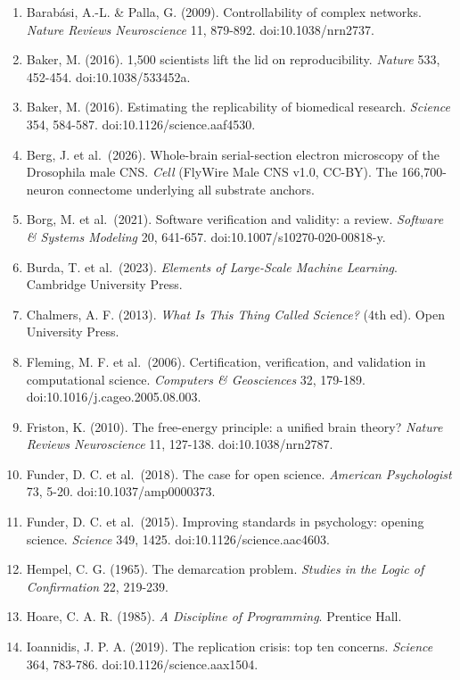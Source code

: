 \documentclass[
]{article}
\providecommand{\tightlist}{%
  \setlength{\itemsep}{0pt}\setlength{\parskip}{0pt}}
\begin{document}
\begin{enumerate}
\def\labelenumi{\arabic{enumi}.}
\tightlist
\item
  Barabási, A.-L. \& Palla, G. (2009). Controllability of complex
  networks. \emph{Nature Reviews Neuroscience} 11, 879-892.
  doi:10.1038/nrn2737.
\item
  Baker, M. (2016). 1,500 scientists lift the lid on reproducibility.
  \emph{Nature} 533, 452-454. doi:10.1038/533452a.
\item
  Baker, M. (2016). Estimating the replicability of biomedical research.
  \emph{Science} 354, 584-587. doi:10.1126/science.aaf4530.
\item
  Berg, J. et al.~(2026). Whole-brain serial-section electron microscopy
  of the Drosophila male CNS. \emph{Cell} (FlyWire Male CNS v1.0,
  CC-BY). The 166,700-neuron connectome underlying all substrate
  anchors.
\item
  Borg, M. et al.~(2021). Software verification and validity: a review.
  \emph{Software \& Systems Modeling} 20, 641-657.
  doi:10.1007/s10270-020-00818-y.
\item
  Burda, T. et al.~(2023). \emph{Elements of Large-Scale Machine
  Learning}. Cambridge University Press.
\item
  Chalmers, A. F. (2013). \emph{What Is This Thing Called Science?} (4th
  ed). Open University Press.
\item
  Fleming, M. F. et al.~(2006). Certification, verification, and
  validation in computational science. \emph{Computers \& Geosciences}
  32, 179-189. doi:10.1016/j.cageo.2005.08.003.
\item
  Friston, K. (2010). The free-energy principle: a unified brain theory?
  \emph{Nature Reviews Neuroscience} 11, 127-138. doi:10.1038/nrn2787.
\item
  Funder, D. C. et al.~(2018). The case for open science. \emph{American
  Psychologist} 73, 5-20. doi:10.1037/amp0000373.
\item
  Funder, D. C. et al.~(2015). Improving standards in psychology:
  opening science. \emph{Science} 349, 1425.
  doi:10.1126/science.aac4603.
\item
  Hempel, C. G. (1965). The demarcation problem. \emph{Studies in the
  Logic of Confirmation} 22, 219-239.
\item
  Hoare, C. A. R. (1985). \emph{A Discipline of Programming}. Prentice
  Hall.
\item
  Ioannidis, J. P. A. (2019). The replication crisis: top ten concerns.
  \emph{Science} 364, 783-786. doi:10.1126/science.aax1504.

\end{enumerate}
\end{document}
